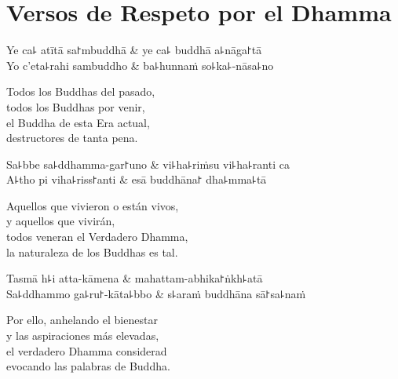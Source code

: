 \chapter{Versos de Respeto por el Dhamma}


\begin{leader}
\end{leader}

\begin{twochants}
  Ye ca꜕ atītā sa꜓mbuddhā & ye ca꜕ buddhā a꜕nāga꜓tā \\
  Yo c'eta꜕rahi sambuddho & ba꜕hunnaṁ so꜕ka꜕-nāsa꜕no \\
\end{twochants}

\begin{english}
  Todos los Buddhas del pasado,\\
  todos los Buddhas por venir,\\
  el Buddha de esta Era actual,\\
  destructores de tanta pena.
\end{english}

\begin{twochants}
  Sa꜕bbe sa꜕ddhamma-gar꜓uno & vi꜕ha꜕riṁsu vi꜕ha꜕ranti ca \\
  A꜕tho pi viha꜕riss꜓anti & esā buddhāna꜓ dha꜕mma꜕tā \\
\end{twochants}

\begin{english}
  Aquellos que vivieron o están vivos,\\
  y aquellos que vivirán,\\
  todos veneran el Verdadero Dhamma,\\
  la naturaleza de los Buddhas es tal.
\end{english}

\begin{twochants}
  Tasmā h꜕i atta-kāmena & mahattam-abhika꜓ṅkh꜕atā \\
  Sa꜕ddhammo ga꜕ru꜓-kāta꜕bbo & s꜕araṁ buddhāna sā꜓sa꜕naṁ \\
\end{twochants}

\begin{english}
  Por ello, anhelando el bienestar\\
  y las aspiraciones más elevadas,\\
  el verdadero Dhamma considerad\\
  evocando las palabras de Buddha.
\end{english}


